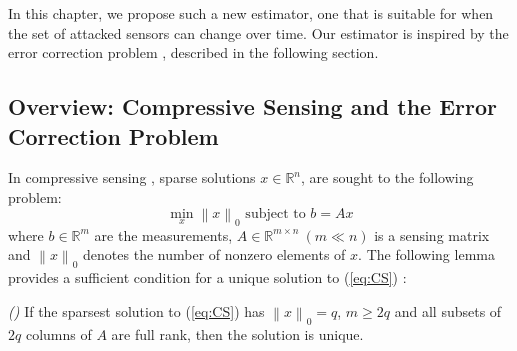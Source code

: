 \documentclass[../../thesis.tex]{subfiles}
\newcommand{\norm}[1]{\left\lVert#1\right\rVert}
\begin{document}
In this chapter, we propose such a new estimator, one that is suitable for when the set of attacked sensors can change over time. Our estimator is inspired by the error correction problem \cite{tao11}, described in the following section. %


\subsection{Overview: Compressive Sensing and the Error Correction Problem \cite{tao11}} \label{sec:error_correction}
In compressive sensing \cite{tao11}, sparse solutions $x\in \mathbb{R}^n$, are sought to the following problem:
\begin{equation}
	\min_x \norm{x}_0 \text{ subject to } b= Ax
	\label{eq:CS}
\end{equation}
where $b \in \mathbb{R}^m$ are the measurements, $A \in \mathbb{R}^{m\times n}~ (m \ll n)$ is a sensing matrix and $\norm{x}_0$ denotes the number of nonzero elements of $x$. The following lemma provides a sufficient condition for a unique solution to (\ref{eq:CS}) \cite{tao11}:

\begin{lem} \emph{(\hspace{1sp}\cite{David_Chang})} \label{lem:CS}
If the sparsest solution to (\ref{eq:CS}) has $\norm{x}_0 = q$, $m\ge 2q$ and all subsets of $2q$ columns of $A$ are full rank, then the solution is unique. 
\end{lem}
\end{document}
